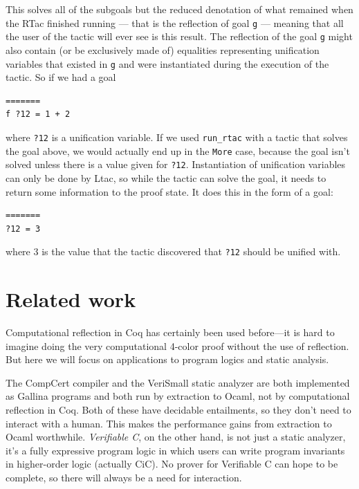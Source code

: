\documentclass{puthesis}
\begin{document}
This solves all of the subgoals but the reduced denotation of what
remained when the RTac finished running --- that is the reflection of
goal \lstinline|g| --- meaning that all the user
of the tactic will ever see is this result. The reflection of the goal
\lstinline|g| might also contain (or be exclusively made of)
equalities representing unification variables that existed in
\lstinline|g| and were instantiated during the execution of the
tactic. So if we had a goal

\begin{lstlisting}
=======
f ?12 = 1 + 2
\end{lstlisting}

where \lstinline|?12| is a unification variable. 
If we used \lstinline|run_rtac| with a tactic that solves the goal above, we
would actually end up in the \lstinline|More| case, because the goal
isn't solved unless there is a value given for
\lstinline|?12|. Instantiation of unification variables can only be
done by Ltac, so while the tactic can solve the goal, it needs to
return some information to the proof state. It does this in the form
of a goal:

\begin{lstlisting}
=======
?12 = 3
\end{lstlisting}

where $3$ is the value that the tactic discovered that
\lstinline|?12| should be unified with.

\section{Related work}
Computational reflection in Coq has certainly been used before---it is
hard to imagine doing the very computational 4-color proof
\cite{gonthier2008formal} without the use of reflection.  But here we
will focus on applications to program logics and static analysis.

The CompCert compiler \cite{leroy09} and the VeriSmall static analyzer
\cite{appel11:cpp} are both implemented as Gallina programs and both
run by extraction to Ocaml, not by computational reflection in Coq.
Both of these have decidable entailments, so they don't need to
interact with a human. This makes the performance gains from
extraction to Ocaml worthwhile. \emph{Verifiable C}, on the other
hand, is not just a static analyzer, it's a fully expressive program
logic in which users can write program invariants in higher-order
logic (actually CiC). No prover for Verifiable C can hope to be
complete, so there will always be a need for interaction.
\end{document}

